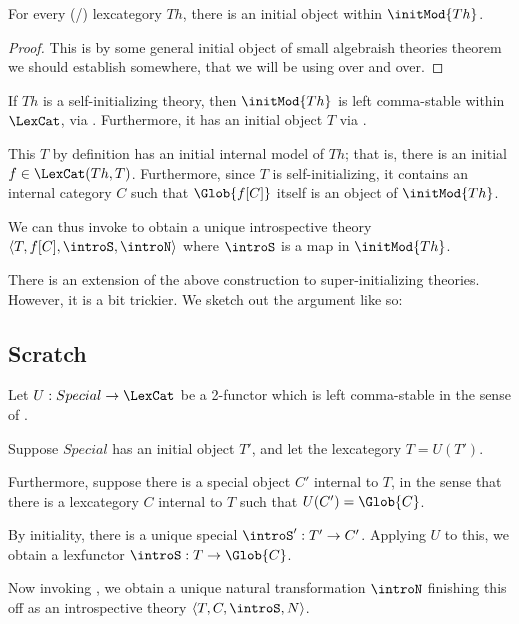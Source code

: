 \begin{theorem}\label{InitialModelWithInitialModel}
For every (\setsmall/) lexcategory $Th$, there is an initial object within $\initMod{Th}$.
\end{theorem}
\begin{proof}
This is by some general initial object of small algebraish theories theorem  we should establish somewhere, that we will be using over and over. \TODO
\end{proof}

\begin{construction}
If $Th$ is a self-initializing theory, then $\initMod{Th}$ is left comma-stable within $\LexCat$, via . Furthermore, it has an initial object $T$ via .

This $T$ by definition has an initial internal model of $Th$; that is, there is an initial $f \in \LexCat(Th, T)$. Furthermore, since $T$ is self-initializing, it contains an internal category $C$ such that $\Glob{f[C]}$ itself is an object of $\initMod{Th}$.

We can thus invoke  to obtain a unique introspective theory $\langle T, f[C], \introS, \introN \rangle$ where $\introS$ is a map in $\initMod{Th}$.
\end{construction}

There is an extension of the above construction to super-initializing theories. However, it is a bit trickier. We sketch out the argument like so: \TODO

\subsection{Scratch}
\begin{construction}
Let $U : Special \to \LexCat$ be a 2-functor which is left comma-stable in the sense of .

Suppose $Special$ has an initial object $T'$, and let the lexcategory $T = U(T')$.

Furthermore, suppose there is a special object $C'$ internal to $T$, in the sense that there is a lexcategory $C$ internal to $T$ such that $U(C') = \Glob{C}$.

By initiality, there is a unique special $\introS' : T' \to C'$. Applying $U$ to this, we obtain a lexfunctor $\introS : T \to \Glob{C}$.

Now invoking , we obtain a unique natural transformation $\introN$ finishing this off as an introspective theory $\langle T, C, \introS, N \rangle$.
\end{construction}

